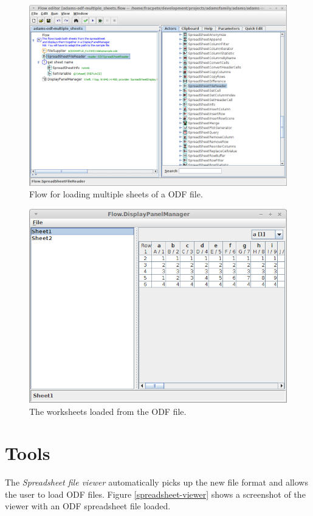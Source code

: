 \documentclass[a4paper]{book}
\begin{document}
\begin{figure}[htb]
  \centering
  \includegraphics[width=12.0cm]{images/spreadsheet-display-flow.png}
  \caption{Flow for loading multiple sheets of a ODF file.}
  \label{spreadsheet-display-flow}
\end{figure}

\begin{figure}[htb]
  \centering
  \includegraphics[width=12.0cm]{images/spreadsheet-display-output.png}
  \caption{The worksheets loaded from the ODF file.}
  \label{spreadsheet-display-output}
\end{figure}

\chapter{Tools}
The \textit{Spreadsheet file viewer} automatically picks up the new file format
and allows the user to load ODF files. Figure \ref{spreadsheet-viewer}
shows a screenshot of the viewer with an ODF spreadsheet file loaded.
\end{document}
